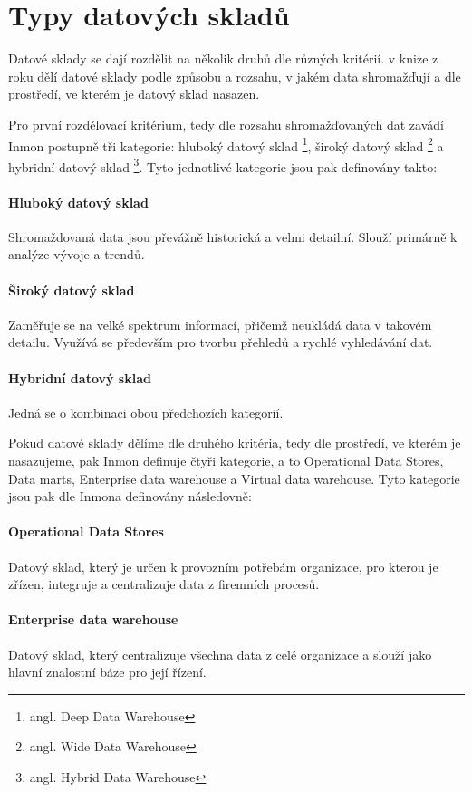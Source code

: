 \documentclass[
  digital,     %
  twoside,     %
  lof,         %
  lot,         %
]{fithesis4}
\begin{document}
\section{Typy datových skladů}
\label{dwh_types}
Datové sklady se dají rozdělit na několik druhů dle různých kritérií. \citeauthor{Inmon2005}
v knize  z roku \citeyear{Inmon2005} dělí datové sklady podle způsobu a rozsahu,
v jakém data shromažďují a dle prostředí, ve kterém je datový sklad nasazen.

Pro první rozdělovací kritérium, tedy dle rozsahu shromažďovaných dat zavádí Inmon
postupně tři kategorie: hluboký datový sklad \footnote{angl. Deep Data Warehouse}, široký
datový sklad \footnote{angl. Wide Data Warehouse} a hybridní datový sklad \footnote{angl. Hybrid Data
Warehouse}. Tyto jednotlivé kategorie jsou pak definovány takto:
\paragraph{Hluboký datový sklad}
Shromažďovaná data jsou převážně historická a velmi detailní. Slouží primárně k analýze vývoje a trendů.
\paragraph{Široký datový sklad}
Zaměřuje se na velké spektrum informací, přičemž neukládá data v takovém detailu. Využívá se především pro tvorbu přehledů a rychlé vyhledávání dat.
\paragraph{Hybridní datový sklad}
Jedná se o kombinaci obou předchozích kategorií.

 \vspace{5mm}
Pokud datové sklady dělíme dle druhého kritéria, tedy dle prostředí, ve kterém je
nasazujeme, pak Inmon definuje čtyři kategorie, a to Operational Data Stores, Data marts,
Enterprise data warehouse a Virtual data warehouse. Tyto kategorie jsou pak dle Inmona definovány následovně:

\paragraph{Operational Data Stores}
Datový sklad, který je určen k provozním potřebám organizace, pro kterou je zřízen, integruje a centralizuje data z firemních procesů.
\paragraph{Enterprise data warehouse}
Datový sklad, který centralizuje všechna data z celé organizace a slouží jako hlavní znalostní báze pro její řízení.
\end{document}
